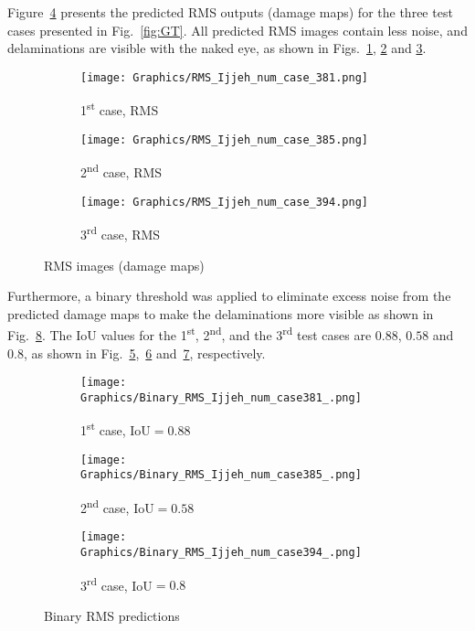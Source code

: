 \documentclass{IOS-Book-Article}
\begin{document}
\begin{sloppypar}
	Figure~\ref{fig:num_cases} presents the predicted RMS outputs (damage maps) for the three test cases presented in Fig.~\ref{fig:GT}.
	All predicted RMS images contain less noise, and delaminations are visible with the naked eye, as shown in Figs.~\ref{fig:num_1st_case}, \ref{fig:num_2nd_case} and \ref{fig:num_3rd_case}.
	\begin{figure}[ht!]
		\centering
		\begin{subfigure}[b]{0.32\textwidth}
			\centering
			\texttt{[image: Graphics/RMS\_Ijjeh\_num\_case\_381.png]}
			\caption{1\textsuperscript{st} case, RMS}
			\label{fig:num_1st_case}
		\end{subfigure}
		\hfill
		\begin{subfigure}[b]{0.32\textwidth}
			\centering
			\texttt{[image: Graphics/RMS\_Ijjeh\_num\_case\_385.png]}
			\caption{2\textsuperscript{nd} case, RMS}
			\label{fig:num_2nd_case}
		\end{subfigure}
		\hfill
		\begin{subfigure}[b]{0.32\textwidth}
			\centering
			\texttt{[image: Graphics/RMS\_Ijjeh\_num\_case\_394.png]}
			\caption{3\textsuperscript{rd} case, RMS}
			\label{fig:num_3rd_case}
		\end{subfigure}
		\caption{RMS images (damage maps)}
		\label{fig:num_cases}
	\end{figure}
	
	Furthermore, a binary threshold was applied to eliminate excess noise from the predicted damage maps to make the delaminations more visible as shown in Fig.~\ref{fig:RMS_num_cases}.
	The IoU values for the 1\textsuperscript{st}, 2\textsuperscript{nd}, and the 3\textsuperscript{rd} test cases are $0.88$, $0.58$ and $0.8$, as shown in Fig.~\ref{fig:Binary_RMS_381},~\ref{fig:Binary_RMS_385} and~\ref{fig:Binary_RMS_394}, respectively.
	\begin{figure}
		\begin{subfigure}[b]{0.32\textwidth}
			\centering
			\texttt{[image: Graphics/Binary\_RMS\_Ijjeh\_num\_case381\_.png]}
			\caption{1\textsuperscript{st} case, IoU\(=0.88\)}
			\label{fig:Binary_RMS_381}
		\end{subfigure}
		\hfill	
		\begin{subfigure}[b]{0.32\textwidth}
			\centering
			\texttt{[image: Graphics/Binary\_RMS\_Ijjeh\_num\_case385\_.png]}
			\caption{2\textsuperscript{nd} case, IoU\(=0.58\)}
			\label{fig:Binary_RMS_385}
		\end{subfigure}
		\hfill
		\begin{subfigure}[b]{0.32\textwidth}
			\centering
			\texttt{[image: Graphics/Binary\_RMS\_Ijjeh\_num\_case394\_.png]}
			\caption{3\textsuperscript{rd} case, IoU\(=0.8\)}
			\label{fig:Binary_RMS_394}
		\end{subfigure}
		\caption{Binary RMS predictions}
		\label{fig:RMS_num_cases}
	\end{figure}	
\end{sloppypar}
\end{document}
